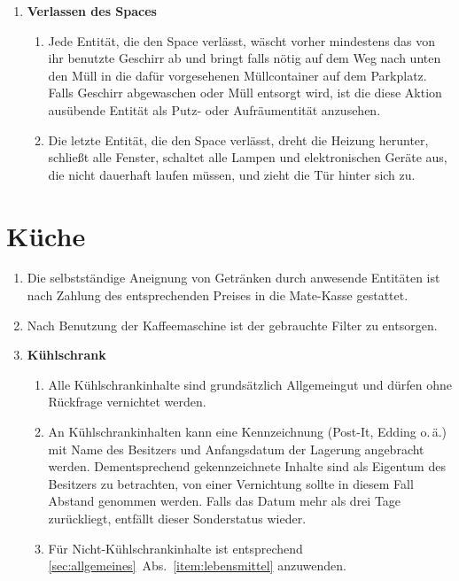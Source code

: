 \documentclass[12pt,a4paper]{scrartcl}
\begin{document}
\begin{enumerate}
  \item\textbf{Verlassen des Spaces}\begin{enumerate}
    \item Jede Entität, die den Space verlässt, wäscht vorher mindestens das von
      ihr benutzte Geschirr ab und bringt falls nötig auf dem Weg nach unten den
      Müll in die dafür vorgesehenen Müllcontainer auf dem Parkplatz. Falls
      Geschirr abgewaschen oder Müll entsorgt wird, ist die diese Aktion
      ausübende Entität als Putz- oder Aufräumentität anzusehen.
    \item Die letzte Entität, die den Space verlässt, dreht die Heizung
      herunter, schließt alle Fenster, schaltet alle Lampen und elektronischen
      Geräte aus, die nicht dauerhaft laufen müssen, und zieht die Tür hinter
      sich zu.
  \end{enumerate}
\end{enumerate}

\section{Küche}
\begin{enumerate}
  \item Die selbstständige Aneignung von Getränken durch anwesende Entitäten ist
    nach Zahlung des entsprechenden Preises in die Mate-Kasse gestattet.
  \item Nach Benutzung der Kaffeemaschine ist der gebrauchte Filter zu
    entsorgen.
  \item\textbf{Kühlschrank}\begin{enumerate}
    \item Alle Kühlschrankinhalte sind grundsätzlich Allgemeingut und dürfen
      ohne Rückfrage vernichtet werden.
    \item An Kühlschrankinhalten kann eine Kennzeichnung (Post-It, Edding
      o.\,ä.) mit Name des Besitzers und Anfangsdatum der Lagerung
      angebracht werden. Dementsprechend gekennzeichnete Inhalte sind als
      Eigentum des Besitzers zu betrachten, von einer Vernichtung sollte in
      diesem Fall Abstand genommen werden. Falls das Datum mehr als drei Tage
      zurückliegt, entfällt dieser Sonderstatus wieder.
    \item Für Nicht-Kühlschrankinhalte ist entsprechend
      \ref{sec:allgemeines}~Abs.~\ref{item:lebensmittel} anzuwenden.
  \end{enumerate}
\end{enumerate}
\end{document}
